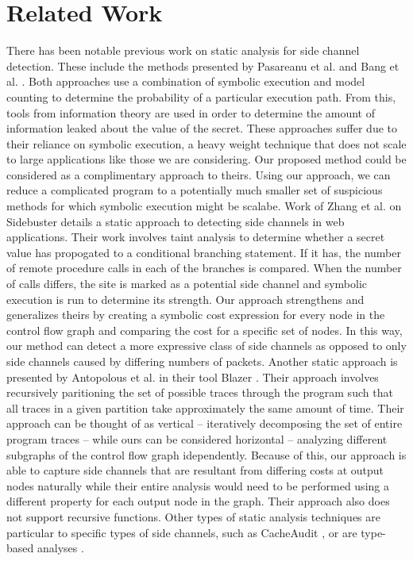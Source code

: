 \section{Related Work}

There has been notable previous work on static analysis for side channel detection. These include the methods presented by Pasareanu et al. \cite{smtmulti} and Bang et al. \cite{BAQ16}. Both approaches use a combination of symbolic execution and model counting to determine the probability of a particular execution path. From this, tools from information theory are used in order to determine the amount of information leaked about the value of the secret. These approaches suffer due to their reliance on symbolic execution, a heavy weight technique that does not scale to large applications like those we are considering. Our proposed method could be considered as a complimentary approach to theirs. Using our approach, we can reduce a complicated program to a potentially much smaller set of suspicious methods for which symbolic execution might be scalabe. Work of Zhang et al. on Sidebuster \cite{sidebuster} details a static approach to detecting side channels in web applications. Their work involves taint analysis to determine whether a secret value has propogated to a conditional branching statement. If it has, the number of remote procedure calls in each of the branches is compared. When the number of calls differs, the site is marked as a potential side channel and symbolic execution is run to determine its strength. Our approach strengthens and generalizes theirs by creating a symbolic cost expression for every node in the control flow graph and comparing the cost for a specific set of nodes.  In this way, our method can detect a more expressive class of side channels as opposed to only side channels caused by differing numbers of packets. Another static approach is presented by Antopolous et al. in their tool Blazer \cite{decomposition}. Their approach involves recursively paritioning the set of possible traces through the program such that all traces in a given partition take approximately the same amount of time. Their approach can be thought of as vertical -- iteratively decomposing the set of entire program traces -- while ours can be considered horizontal -- analyzing different subgraphs of the control flow graph idependently.  Because of this, our approach is able to capture side channels that are resultant from differing costs at output nodes naturally while their entire analysis would need to be performed using a different property for each output node in the graph. Their approach also does not support recursive functions. Other types of static analysis techniques are particular to specific types of side channels, such as CacheAudit \cite{cacheaudit}, or are type-based analyses \cite{fixbyconstant,hedin}.

